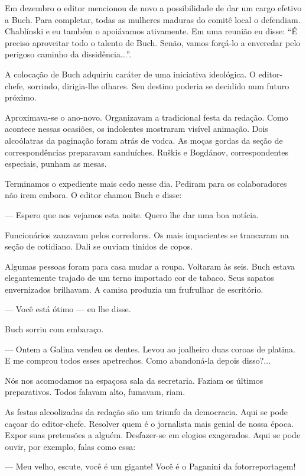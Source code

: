 Em dezembro o editor mencionou de novo a possibilidade de dar um cargo
efetivo a Buch. Para completar, todas as mulheres maduras do comitê
local o defendiam. Chablínski e eu também o apoiávamos ativamente. Em
uma reunião eu disse: ``É preciso aproveitar todo o talento de Buch.
Senão, vamos forçá-lo a enveredar pelo perigoso caminho da
dissidência...''.

A colocação de Buch adquiriu caráter de uma iniciativa ideológica. O
editor-chefe, sorrindo, dirigia-lhe olhares. Seu destino poderia se
decidido num futuro próximo.

Aproximava-se o ano-novo. Organizavam a tradicional festa da redação.
Como acontece nessas ocasiões, os indolentes mostraram visível animação.
Dois alcoólatras da paginação foram atrás de vodca. As moças gordas da
seção de correspondências preparavam sanduíches. Ruškis e Bogdánov,
correspondentes especiais, punham as mesas.

Terminamos o expediente mais cedo nesse dia. Pediram para os
colaboradores não irem embora. O editor chamou Buch e disse:

--- Espero que nos vejamos esta noite. Quero lhe dar uma boa notícia.

Funcionários zanzavam pelos corredores. Os mais impacientes se trancaram
na seção de cotidiano. Dali se ouviam tinidos de copos.

Algumas pessoas foram para casa mudar a roupa. Voltaram às seis. Buch
estava elegantemente trajado de um terno importado cor de tabaco. Seus
sapatos envernizados brilhavam. A camisa produzia um frufrulhar de
escritório.

--- Você está ótimo --- eu lhe disse.

Buch sorriu com embaraço.

--- Ontem a Galina vendeu os dentes. Levou ao joalheiro duas coroas de
platina. E me comprou todos esses apetrechos. Como abandoná-la depois
disso?...

Nós nos acomodamos na espaçosa sala da secretaria. Faziam os últimos
preparativos. Todos falavam alto, fumavam, riam.

As festas alcoolizadas da redação são um triunfo da democracia. Aqui se
pode caçoar do editor-chefe. Resolver quem é o jornalista mais genial de
nossa época. Expor suas pretensões a alguém. Desfazer-se em elogios
exagerados. Aqui se pode ouvir, por exemplo, falas como essa:

--- Meu velho, escute, você é um gigante! Você é o Paganini da
fotorreportagem!

